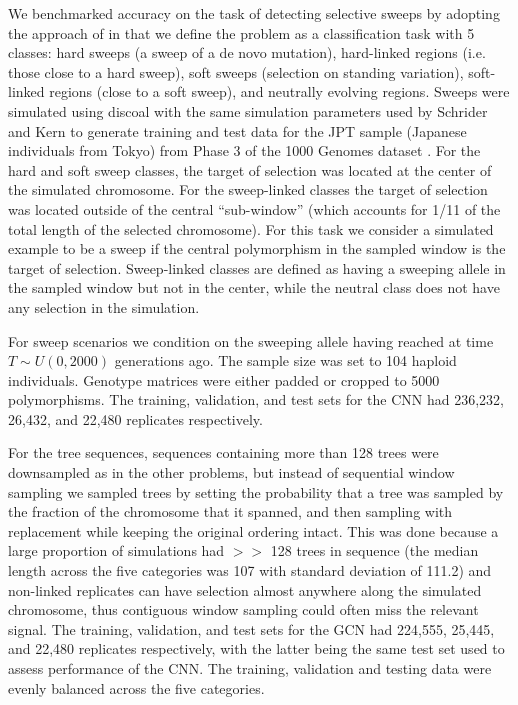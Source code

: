 We benchmarked accuracy on the task of detecting selective sweeps by adopting the approach of \cite{flagelUnreasonableEffectivenessConvolutional2019,schriderHICRobustIdentification2016} in that we define the problem as a classification task with 5 classes: hard sweeps (a sweep of a de novo mutation), hard-linked regions (i.e. those close to a hard sweep), soft sweeps (selection on standing variation), soft-linked regions (close to a soft sweep), and neutrally evolving regions. Sweeps were simulated using discoal \cite{kernDiscoalFlexibleCoalescent2016} with the same simulation parameters used by Schrider and Kern \cite{schriderSoftSweepsAre2017} to generate training and test data for the JPT sample (Japanese individuals from Tokyo) from Phase 3 of the 1000 Genomes dataset \cite{autonGlobalReferenceHuman2015}. 
For the hard and soft sweep classes, the target of selection was located at the center of the simulated chromosome. For the sweep-linked classes the target of selection was located outside of the central “sub-window” (which accounts for 1/11 of the total length of the selected chromosome). For this task we consider a simulated example to be a sweep if the central polymorphism in the sampled window is the target of selection. Sweep-linked classes are defined as having a sweeping allele in the sampled window but not in the center, while the neutral class does not have any selection in the simulation.

For sweep scenarios we condition on the sweeping allele having reached at time $T \sim U(0, 2000)$ generations ago. The sample size was set to 104 haploid individuals. Genotype matrices were either padded or cropped to 5000 polymorphisms. The training, validation, and test sets for the CNN had 236,232, 26,432, and 22,480 replicates respectively.

For the tree sequences, sequences containing more than 128 trees were downsampled as in the other problems, but instead of sequential window sampling we sampled trees by setting the probability that a tree was sampled by the fraction of the chromosome that it spanned, and then sampling with replacement while keeping the original ordering intact. This was done because a large proportion of simulations had $>>$ 128 trees in sequence (the median length across the five categories was 107 with standard deviation of 111.2) and non-linked replicates can have selection almost anywhere along the simulated chromosome, thus contiguous window sampling could often miss the relevant signal. The training, validation, and test sets for the GCN had 224,555, 25,445, and 22,480 replicates respectively, with the latter being the same test set used to assess performance of the CNN. The training, validation and testing data were evenly balanced across the five categories.

